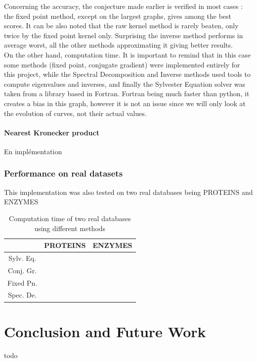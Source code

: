 \documentclass{article}
\theoremstyle{definition}
\begin{document}
Concerning the accuracy, the conjecture made earlier is verified in most cases : the fixed point method, except on the largest graphs, gives among the best scores. It can be also noted that the raw kernel method is rarely beaten, only twice by the fixed point kernel only. Surprising the inverse method performs in average worst, all the other methods approximating it giving better results.\\
On the other hand, computation time. It is important to remind that in this case some methods (fixed point, conjugate gradient) were implemented entirely for this project, while the Spectral Decomposition and Inverse methods used tools to compute eigenvalues and inverses, and finally the Sylvester Equation solver was taken from a library based in Fortran. Fortran being much faster than python, it creates a bias in this graph, however it is not an issue since we will only look at the evolution of curves, not their actual values.
\paragraph{Nearest Kronecker product}
En implémentation

\subsubsection{Performance on real datasets}
This implementation was also tested on two real databases being PROTEINS and ENZYMES
\begin{table}
	\begin{center}
		\begin{tabular}{|c||c|c}
			\hline
			& PROTEINS & ENZYMES\\
			\hline
			Sylv. Eq. & & \\
			Conj. Gr. & & \\
			Fixed Pn. & & \\
			Spec. De. & & \\
			\hline
		\end{tabular}
	\end{center}
\caption{Computation time of two real databases using different methods}
\end{table}

\section{Conclusion and Future Work}
todo
\end{document}
